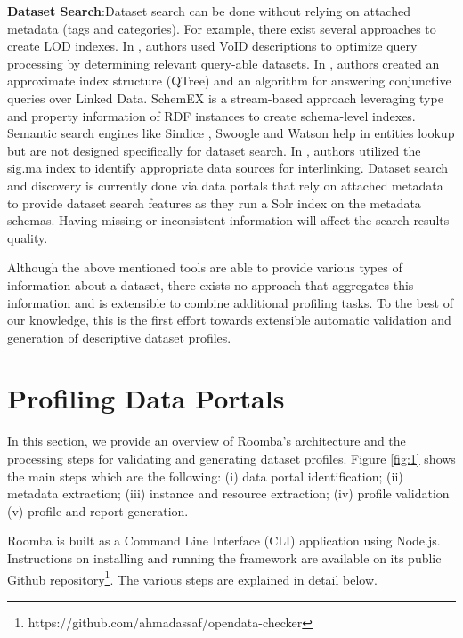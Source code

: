 \documentclass[runningheads,a4paper]{llncs}
\begin{document}
\textbf{Dataset Search}:Dataset search can be done without relying on attached metadata (tags and categories). For example, there exist several approaches to create LOD indexes. In \cite{Alexander:LDOW09}, authors used VoID descriptions to optimize query processing by determining relevant query-able datasets. In \cite{Harth:2010:DSO:1772690.1772733}, authors created an approximate index structure (QTree) and an algorithm for answering conjunctive queries over Linked Data. SchemEX \cite{Konrath:2012:SEC:2399444.2399563} is a stream-based approach leveraging type and property information of RDF instances to create schema-level indexes.\\
Semantic search engines like Sindice \cite{Delbru2010a}, Swoogle \cite{Ding2004} and Watson \cite{d'Aquin:2011:WMS:2019470.2019476} help in entities lookup but are not designed specifically for dataset search. In \cite{whatShouldILinkTo}, authors utilized the sig.ma index \cite{sig.ma} to identify appropriate data sources for interlinking. Dataset search and discovery is currently done via data portals that rely on attached metadata to provide dataset search features as they run a Solr index on the metadata schemas. Having missing or inconsistent information will affect the search results quality.

Although the above mentioned tools are able to provide various types of information about a dataset, there exists no approach that aggregates this information and is extensible to combine additional profiling tasks. To the best of our knowledge, this is the first effort towards extensible automatic validation and generation of descriptive dataset profiles.


\section{Profiling Data Portals}
\label{sec:framework}

In this section, we provide an overview of Roomba's architecture and the processing steps for validating and generating dataset profiles. Figure \ref{fig:1} shows the main steps which are the following: (i) data portal identification; (ii) metadata extraction; (iii) instance and resource extraction; (iv) profile validation (v) profile and report generation.

Roomba is built as a Command Line Interface (CLI) application using Node.js. Instructions on installing and running the framework are available on its public Github repository\footnote{https://github.com/ahmadassaf/opendata-checker}. The various steps are explained in detail below.
\end{document}
